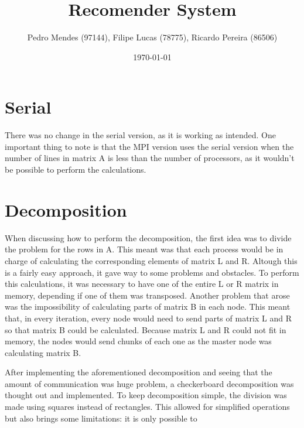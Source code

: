 \documentclass[a4paper]{article}
\begin{document}
\title{Recomender System}
\author{Pedro Mendes (97144), Filipe Lucas (78775), Ricardo Pereira (86506)}
\date{\today}
\maketitle


\section{Serial} %
There was no change in the serial version, as it is working as intended. One important 
thing to note is that the MPI version uses the serial version when the number of lines
in matrix A is less than the number of processors, as it wouldn't be possible to perform
the calculations. %

\section{Decomposition}
When discussing how to perform the decomposition, the first idea was to divide the problem 
for the rows in A. This meant was that each process would be in charge of 
calculating the corresponding elements of matrix L and R. Altough this is a fairly easy
approach, it gave way to some problems and obstacles. To perform this calculations,
it was necessary to have one of the entire L or R matrix in memory, depending if one
of them was transposed. %
Another problem that arose was the impossibility of calculating parts of matrix B in
each node. This meant that, in every iteration, every node would need to send parts of
matrix L and R so that matrix B could be calculated. Because matrix L and R could not fit
in memory, the nodes would send chunks of each one as the master node was calculating 
matrix B. %

After implementing the aforementioned decomposition and seeing that the amount of
communication was huge problem, a checkerboard decomposition was thought out and 
implemented. To keep decomposition simple, the division was made using squares
instead of rectangles. This allowed for simplified operations %
but also brings some limitations: it is only possible to 
 

\end{document}
